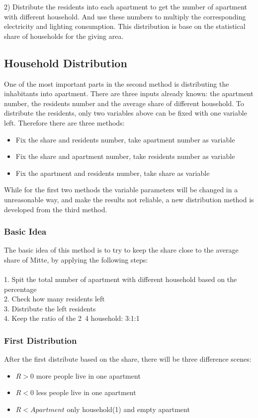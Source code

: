 2) Distribute the residents into each apartment to get the number of apartment with different household. And use these numbers to multiply the corresponding electricity and lighting consumption. This distribution is base on the statistical share of households for the giving area.

\subsection{Household Distribution}
One of the most important parts in the second method is distributing the inhabitants into apartment. There are three inputs already known: the apartment number, the residents number and the average share of different household. To distribute the residents, only two variables above can be fixed with one variable left. Therefore there are three methods: 

\begin{itemize}
\item Fix the share and residents number, take apartment number as variable
\item Fix the share and apartment number, take residents number as variable
\item Fix the apartment and residents number, take share as variable
\end{itemize}

While for the first two methods the variable parameters will be changed in a unreasonable way, and make the results not reliable, a new distribution method is developed from the third method. 

\subsubsection{Basic Idea}
The basic idea of this method is to try to keep the share close to the average share of Mitte, by applying the following steps:\\
\\
1. Spit the total number of apartment with different household based on the percentage \\
2. Check how many residents left\\
3. Distribute the left residents\\
4. Keep the ratio of the 2~4 household: 3:1:1

\subsubsection{First Distribution}
After the first distribute based on the share, there will be three difference scenes:\\
\begin{itemize}
\item $R > 0$   more people live in one apartment
\item $R < 0$   less people live in one apartment
\item $R < Apartment$  only household(1) and empty apartment
\end{itemize}

